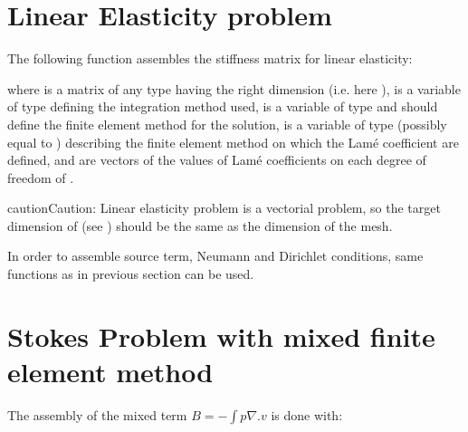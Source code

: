 \documentclass[a4paper,11pt,english]{sphinxmanual}
\begin{document}
\section{Linear Elasticity problem}
\label{\detokenize{userdoc/asm:linear-elasticity-problem}}
The following function assembles the stiffness matrix for linear elasticity:

\begin{sphinxVerbatim}[commandchars=\\\{\}]
  
                                                     
\end{sphinxVerbatim}

where  is a matrix of any type having the right dimension (i.e. here
),  is a variable of type  defining the integration
method used,  is a variable of type  and should define the finite
element method for the solution,  is a variable of type  (possibly
equal to ) describing the finite element method on which the Lamé
coefficient are defined,  and  are vectors of the values of Lamé
coefficients on each degree of freedom of .

\begin{sphinxadmonition}{caution}{Caution:}
Linear elasticity problem is a vectorial problem, so the target dimension of
 (see ) should be the same as the dimension of the
mesh.
\end{sphinxadmonition}

In order to assemble source term, Neumann and Dirichlet conditions, same functions
as in previous section can be used.


\section{Stokes Problem with mixed finite element method}
\label{\detokenize{userdoc/asm:stokes-problem-with-mixed-finite-element-method}}
The assembly of the mixed term \(B = - \int p\nabla.v\) is done with:
\end{document}
